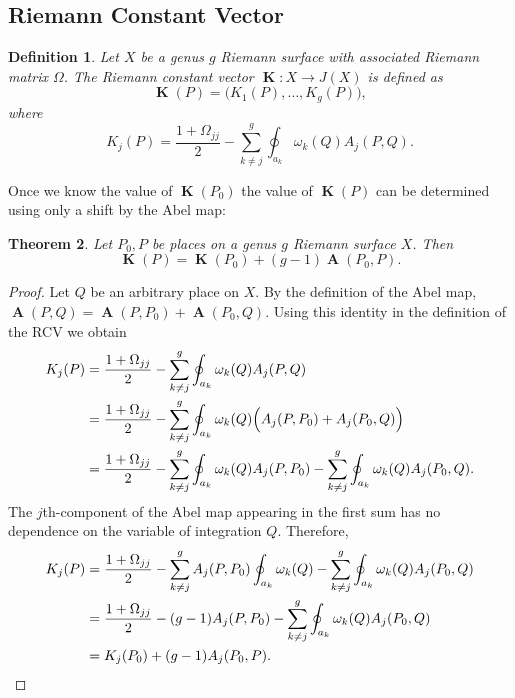 \documentclass[12pt]{article}
\newtheorem{theorem}{Theorem}
\newtheorem{definition}[theorem]{Definition}
\theoremstyle{definition}
\DeclareMathOperator{\RCV}{\boldsymbol{K}}
\DeclareMathOperator{\Abel}{\boldsymbol{A}}
\begin{document}
\subsection{Riemann Constant Vector}



\begin{definition} \label{def:rcv}
Let $X$ be a genus $g$ Riemann surface with associated Riemann matrix
$\Omega$. The Riemann constant vector $\RCV : X \to J(X)$ is defined as
\begin{equation} \label{eqn:rcv1}
  \RCV(P) = \big( K_1(P), \ldots, K_g(P) \big),
\end{equation}
where
\begin{equation} \label{eqn:rcv2}
  K_j(P) = \frac{1 + \Omega_{jj}}{2} - \sum_{k \neq j}^g
           \oint_{a_k} \omega_k(Q) A_j(P,Q).
\end{equation}
\end{definition}
Once we know the value of $\RCV(P_0)$ the value of $\RCV(P)$ can be
determined using only a shift by the Abel map:
\begin{theorem} \label{thm:RCVshift}
  Let $P_0,P$ be places on a genus $g$ Riemann surface $X$. Then
  \begin{equation} \label{eqn:RCVshift}
    \RCV(P) = \RCV(P_0) + (g-1)\Abel(P_0,P).
  \end{equation}
\end{theorem}
\begin{proof}
Let $Q$ be an arbitrary place on $X$. By the definition of the Abel map,
$\Abel(P,Q) = \Abel(P,P_0) + \Abel(P_0,Q)$. Using this identity in the
definition of the RCV we obtain
\begin{align} \label{eqn:RCVshift1}
  K_j(P)
  &=
  \frac{1 + \Omega_{jj}}{2}
  -
  \sum_{k \neq j}^g
  \oint_{a_k} \omega_k(Q) A_j(P,Q)  \notag \\
  &=
  \frac{1 + \Omega_{jj}}{2}
  -
  \sum_{k \neq j}^g
  \oint_{a_k} \omega_k(Q) \Big( A_j(P,P_0) + A_j(P_0,Q) \Big)  \notag \\
  &=
  \frac{1 + \Omega_{jj}}{2}
  -
  \sum_{k \neq j}^g
  \oint_{a_k} \omega_k(Q) A_j(P,P_0)
  -
  \sum_{k \neq j}^g
  \oint_{a_k} \omega_k(Q) A_j(P_0,Q).
\end{align}
The $j$th-component of the Abel map appearing in the first sum has no
dependence on the variable of integration $Q$. Therefore,
\begin{align} \label{eqn:RCVshift2}
  K_j(P)
  &=
  \frac{1 + \Omega_{jj}}{2}
  -
  \sum_{k \neq j}^g
  A_j(P,P_0)
  \oint_{a_k} \omega_k(Q)
  -
  \sum_{k \neq j}^g
  \oint_{a_k} \omega_k(Q) A_j(P_0,Q) \notag \\
  &=
  \frac{1 + \Omega_{jj}}{2}
  -
  (g-1) A_j(P,P_0)
  -
  \sum_{k \neq j}^g
  \oint_{a_k} \omega_k(Q) A_j(P_0,Q) \notag \\
  &=
  K_j(P_0) + (g-1)A_j(P_0,P).
\end{align}
\end{proof}
\end{document}
